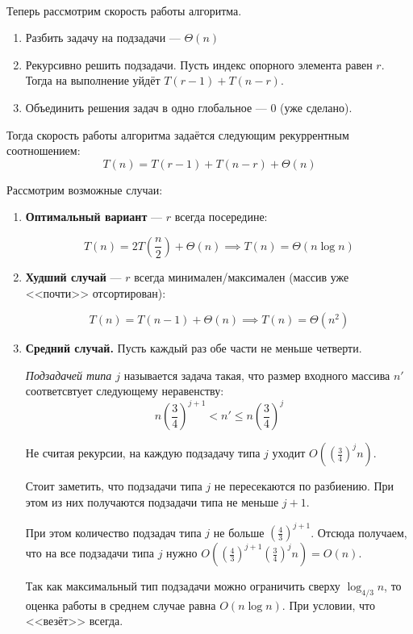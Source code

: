 \

Теперь рассмотрим скорость работы алгоритма.

\begin{enumerate}
    \item Разбить задачу на подзадачи --- $\Theta(n)$
    \item Рекурсивно решить подзадачи. Пусть индекс опорного элемента равен $r$. Тогда на выполнение уйдёт $T(r-1) + T(n-r)$.
    \item Объединить решения задач в одно глобальное --- $0$ (уже сделано).
\end{enumerate}

Тогда скорость работы алгоритма задаётся следующим рекуррентным соотношением:
\[T(n) = T(r-1) + T(n-r) + \Theta(n)\]

Рассмотрим возможные случаи:

\begin{enumerate}
	\item \textbf{Оптимальный вариант} --- $r$ всегда посередине:
	
	\[T(n) = 2T\left(\frac{n}{2}\right) + \Theta(n) \implies T(n) = \Theta(n\log n)\]
	
	\item \textbf{Худший случай} --- $r$ всегда минимален/максимален (массив уже <<почти>> отсортирован):
	
	\[T(n) = T(n-1) + \Theta(n) \implies T(n) = \Theta(n^2)\]
	
	\item \textbf{Средний случай.} Пусть каждый раз обе части не меньше четверти.
	
	\emph{Подзадачей типа $j$} называется задача такая, что размер входного массива $n'$ соответсвтует следующему неравенству:
	\[n\left(\frac{3}{4}\right)^{j+1} < n' \leqslant n\left(\frac{3}{4}\right)^{j}\]
	
	Не считая рекурсии, на каждую подзадачу типа $j$ уходит $O\left(\left(\frac{3}{4}\right)^{j}n\right)$.
	
	Стоит заметить, что подзадачи типа $j$ не пересекаются по разбиению. При этом из них получаются подзадачи типа не меньше $j+1$.
	
	При этом количество подзадач типа $j$ не больше $\left(\frac{4}{3}\right)^{j+1}$. Отсюда получаем, что на все подзадачи типа $j$ нужно $O\left(\left(\frac{4}{3}\right)^{j+1}\left(\frac{3}{4}\right)^{j}n\right) = O(n)$.
	
	Так как максимальный тип подзадачи можно ограничить сверху $\log_{4/3} n$, то оценка работы в среднем случае равна $O(n \log n)$. При условии, что <<везёт>> всегда.
\end{enumerate}

